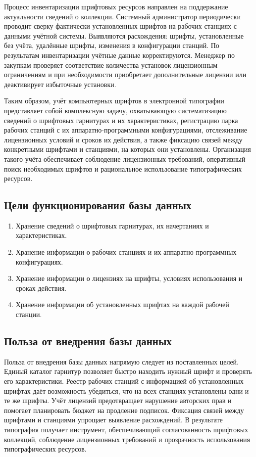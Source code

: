Процесс инвентаризации шрифтовых ресурсов направлен на поддержание актуальности сведений о коллекции. Системный администратор периодически проводит сверку фактически установленных шрифтов на рабочих станциях с данными учётной системы. Выявляются расхождения: шрифты, установленные без учёта, удалённые шрифты, изменения в конфигурации станций. По результатам инвентаризации учётные данные корректируются. Менеджер по закупкам проверяет соответствие количества установок лицензионным ограничениям и при необходимости приобретает дополнительные лицензии или деактивирует избыточные установки.

Таким образом, учёт компьютерных шрифтов в электронной типографии представляет собой комплексную задачу, охватывающую систематизацию сведений о шрифтовых гарнитурах и их характеристиках, регистрацию парка рабочих станций с их аппаратно-программными конфигурациями, отслеживание лицензионных условий и сроков их действия, а также фиксацию связей между конкретными шрифтами и станциями, на которых они установлены. Организация такого учёта обеспечивает соблюдение лицензионных требований, оперативный поиск необходимых шрифтов и рациональное использование типографических ресурсов.

\subsection{Цели функционирования базы данных}

\begin{enumerate}
    \item Хранение сведений о шрифтовых гарнитурах, их начертаниях и характеристиках.
    \item Хранение информации о рабочих станциях и их аппаратно-программных конфигурациях.
    \item Хранение информации о лицензиях на шрифты, условиях использования и сроках действия.
    \item Хранение информации об установленных шрифтах на каждой рабочей станции.
\end{enumerate}

\subsection{Польза от внедрения базы данных}

Польза от внедрения базы данных напрямую следует из поставленных целей. Единый каталог гарнитур позволяет быстро находить нужный шрифт и проверять его характеристики. Реестр рабочих станций с информацией об установленных шрифтах даёт возможность убедиться, что на всех станциях установлены одни и те же шрифты. Учёт лицензий предотвращает нарушение авторских прав и помогает планировать бюджет на продление подписок. Фиксация связей между шрифтами и станциями упрощает выявление расхождений. В результате типография получает инструмент, обеспечивающий согласованность шрифтовых коллекций, соблюдение лицензионных требований и прозрачность использования типографических ресурсов.

